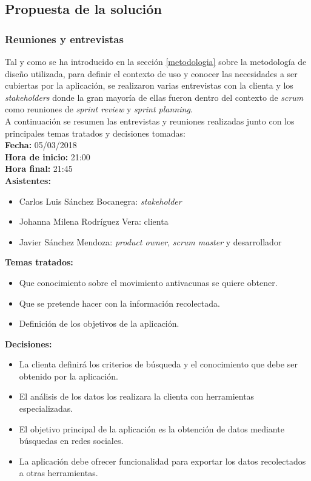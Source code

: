 \documentclass[11pt,a4paper]{article}
\begin{document}
\subsection{Propuesta de la solución}
\medskip 

\subsubsection{Reuniones y entrevistas}
Tal y como se ha introducido en la sección \ref{metodologia} sobre la metodología de diseño utilizada, para definir el contexto de uso y conocer las necesidades a ser cubiertas por la aplicación, se realizaron varias entrevistas con la clienta y los \textit{stakeholders} donde la gran mayoría de ellas fueron dentro del contexto de \textit{scrum} como reuniones de \textit{sprint review} y \textit{sprint planning}.
\\

A continuación se resumen las entrevistas y reuniones realizadas junto con los principales temas tratados y decisiones tomadas:
\\

\noindent\textbf{Fecha:} 05/03/2018
\\
\noindent\textbf{Hora de inicio:} 21:00
\\
\noindent\textbf{Hora final:} 21:45
\\
\noindent\textbf{Asistentes:} 
\begin{itemize}
\item Carlos Luis Sánchez Bocanegra: \textit{stakeholder}
\item Johanna Milena Rodríguez Vera: clienta
\item Javier Sánchez Mendoza: \textit{product owner}, \textit{scrum master} y desarrollador
\end{itemize}
\noindent\textbf{Temas tratados:}
\begin{itemize}
\item Que conocimiento sobre el movimiento antivacunas se quiere obtener. 
\item Que se pretende hacer con la información recolectada.
\item Definición de los objetivos de la aplicación.
\end{itemize}
\noindent\textbf{Decisiones:}
\begin{itemize}
\item La clienta definirá los criterios de búsqueda y el conocimiento que debe ser obtenido por la aplicación.
\item El análisis de los datos los realizara la clienta con herramientas especializadas.
\item El objetivo principal de la aplicación es la obtención de datos mediante búsquedas en redes sociales.
\item La aplicación debe ofrecer funcionalidad para exportar los datos recolectados a otras herramientas.
\end{itemize}
\end{document}
